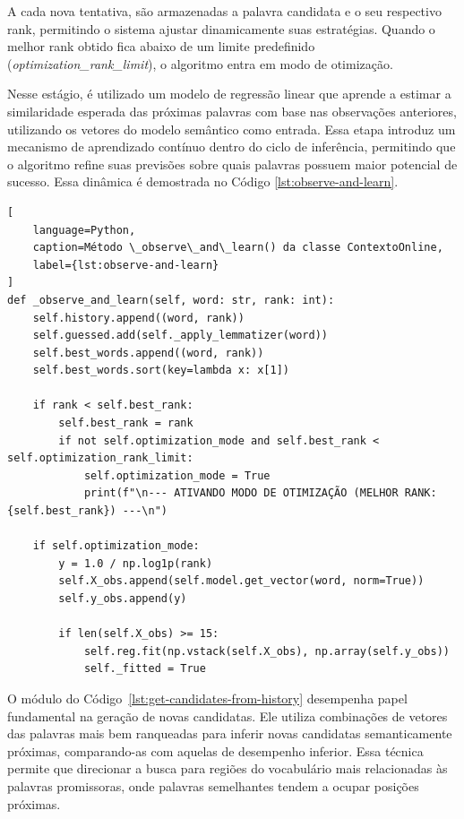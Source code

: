 A cada nova tentativa, são armazenadas a palavra candidata e o seu respectivo rank, permitindo o sistema ajustar dinamicamente suas estratégias. Quando o melhor rank obtido fica abaixo de um limite predefinido (\textit{optimization\_rank\_limit}), o algoritmo entra em modo de otimização.

Nesse estágio, é utilizado um modelo de regressão linear que aprende a estimar a similaridade esperada das próximas palavras com base nas observações anteriores, utilizando os vetores do modelo semântico como entrada. Essa etapa introduz um mecanismo de aprendizado contínuo dentro do ciclo de inferência, permitindo que o algoritmo refine suas previsões sobre quais palavras possuem maior potencial de sucesso. Essa dinâmica é demostrada no Código \ref{lst:observe-and-learn}.

\begin{lstlisting}[
    language=Python,
    caption=Método \_observe\_and\_learn() da classe ContextoOnline,
    label={lst:observe-and-learn}
]
def _observe_and_learn(self, word: str, rank: int):
    self.history.append((word, rank))
    self.guessed.add(self._apply_lemmatizer(word))
    self.best_words.append((word, rank))
    self.best_words.sort(key=lambda x: x[1])
    
    if rank < self.best_rank:
        self.best_rank = rank
        if not self.optimization_mode and self.best_rank < self.optimization_rank_limit:
            self.optimization_mode = True
            print(f"\n--- ATIVANDO MODO DE OTIMIZAÇÃO (MELHOR RANK: {self.best_rank}) ---\n")

    if self.optimization_mode:
        y = 1.0 / np.log1p(rank)
        self.X_obs.append(self.model.get_vector(word, norm=True))
        self.y_obs.append(y)

        if len(self.X_obs) >= 15:
            self.reg.fit(np.vstack(self.X_obs), np.array(self.y_obs))
            self._fitted = True
\end{lstlisting}

O módulo do Código~\ref{lst:get-candidates-from-history} desempenha papel fundamental na geração de novas candidatas. Ele utiliza combinações de vetores das palavras mais bem ranqueadas para inferir novas candidatas semanticamente próximas, comparando-as com aquelas de desempenho inferior. Essa técnica permite que direcionar a busca para regiões do vocabulário mais relacionadas às palavras promissoras, onde palavras semelhantes tendem a ocupar posições próximas.

